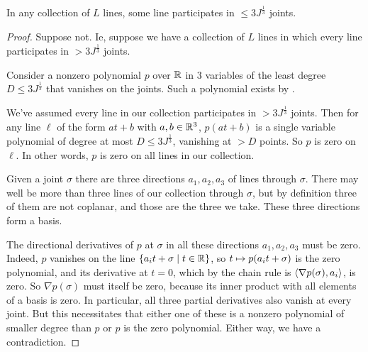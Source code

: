 \begin{boxlemma}
    In any collection of $L$ lines, some line participates in $\leq 3J^{\frac{1}{3}}$ joints.
\end{boxlemma}
\begin{proof}
    Suppose not. Ie, suppose we have a collection of $L$ lines in which every line participates in $> 3 J^{\frac{1}{3}}$ joints.
    
    Consider a nonzero polynomial $p$ over $\mathbb{R}$ in $3$ variables of the least degree $D \leq 3J^{\frac{1}{3}}$ that vanishes on the joints. Such a polynomial exists by .

    We've assumed every line in our collection participates in $>3 J^{\frac{1}{3}}$ joints. Then for any line $\ell$ of the form $at + b$ with $a, b \in \mathbb{R}^3$, $p(at + b)$ is a single variable polynomial of degree at most $D \leq 3J^{\frac{1}{3}}$, vanishing at $> D$ points. So $p$ is zero on $\ell$. In other words, $p$ is zero on all lines in our collection.

    Given a joint $\sigma$ there are three directions $a_1, a_2, a_3$ of lines through $\sigma$. There may well be more than three lines of our collection through $\sigma$, but by definition three of them are not coplanar, and those are the three we take. These three directions form a basis.

    \begin{figure}[H]
        \centering
    \end{figure}

    The directional derivatives of $p$ at $\sigma$ in all these directions $a_1, a_2, a_3$ must be zero. Indeed, $p$ vanishes on the line $\left\{ a_i t + \sigma \; \middle\vert \; t \in \mathbb{R} \right\}$, so $t \mapsto p\!\left( a_i t + \sigma \right)$ is the zero polynomial, and its derivative at $t = 0$, which by the chain rule is $\left\langle \nabla p (\sigma), a_i \right\rangle$, is zero. So $\nabla p (\sigma)$ must itself be zero, because its inner product with all elements of a basis is zero. In particular, all three partial derivatives also vanish at every joint. But this necessitates that either one of these is a nonzero polynomial of smaller degree than $p$ or $p$ is the zero polynomial. Either way, we have a contradiction.
\end{proof}

